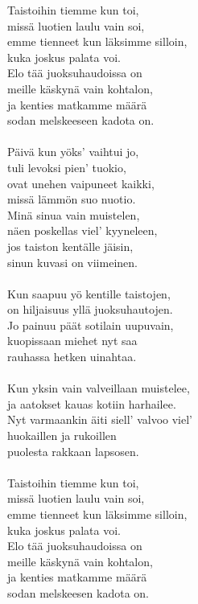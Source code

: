 
Taistoihin tiemme kun toi, \\ missä luotien laulu vain soi, \\ emme tienneet kun läksimme silloin, \\ kuka joskus palata voi. \\ Elo tää juoksuhaudoissa on \\ meille käskynä vain kohtalon, \\ ja kenties matkamme määrä \\ sodan melskeeseen kadota on. \\ \hspace{10mm} \\ Päivä kun yöks' vaihtui jo, \\ tuli levoksi pien' tuokio, \\ ovat unehen vaipuneet kaikki, \\ missä lämmön suo nuotio. \\ Minä sinua vain muistelen, \\ näen poskellas viel' kyyneleen, \\ jos taiston kentälle jäisin, \\ sinun kuvasi on viimeinen. \\ \hspace{10mm} \\ Kun saapuu yö kentille taistojen, \\ on hiljaisuus yllä juoksuhautojen. \\ Jo painuu päät sotilain uupuvain, \\ kuopissaan miehet nyt saa \\ rauhassa hetken uinahtaa. \\ \hspace{10mm} \\ Kun yksin vain valveillaan muistelee, \\ ja aatokset kauas kotiin harhailee. \\ Nyt varmaankin äiti siell' valvoo viel' \\ huokaillen ja rukoillen \\ puolesta rakkaan lapsosen. \\ \hspace{10mm} \\ Taistoihin tiemme kun toi, \\ missä luotien laulu vain soi, \\ emme tienneet kun läksimme silloin, \\ kuka joskus palata voi. \\ Elo tää juoksuhaudoissa on \\ meille käskynä vain kohtalon, \\ ja kenties matkamme määrä \\ sodan melskeesen kadota on.